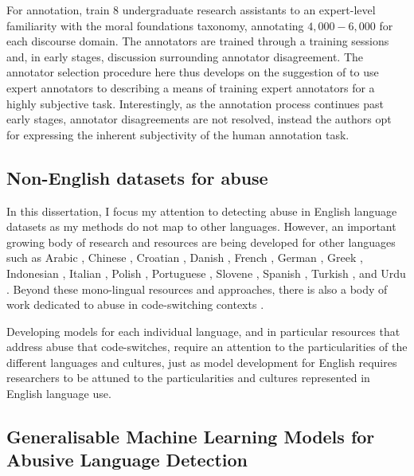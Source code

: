 For annotation, \citet{Hoover:2019} train $8$ undergraduate research assistants to an expert-level familiarity with the moral foundations taxonomy, annotating $4,000 - 6,000$ for each discourse domain. The annotators are trained through a training sessions and, in early stages, discussion surrounding annotator disagreement.  
The annotator selection procedure here thus develops on the suggestion of \citet{Waseem:2016} to use expert annotators to describing a means of training expert annotators for a highly subjective task. Interestingly, as the annotation process continues past early stages, annotator disagreements are not resolved, instead the authors opt for expressing the inherent subjectivity of the human annotation task.

\subsection{Non-English datasets for abuse}

In this dissertation, I focus my attention to detecting abuse in English language datasets as my methods do not map to other languages. However, an important growing body of research and resources are being developed for other languages such as Arabic \citep{Arabic abuse papers}, Chinese \citep{Chinese abuse papers}, Croatian \citep{Croatian papers}, Danish \citep{Danish abuse data}, French \citep{French papers}, German \citep{German papers}, Greek \citep{Greek papers}, Indonesian \citep{Indonesian papers}, Italian \citep{Italian papers}, Polish \citep{Polish papers}, Portuguese \citep{Portuguese papers}, Slovene \citep{Slovenian papers}, Spanish \citep{Spanish papers}, Turkish \citep{Turkish papers}, and Urdu \citep{Urdu papers}. Beyond these mono-lingual resources and approaches, there is also a body of work dedicated to abuse in code-switching contexts \citep{Code switching papers}.

Developing models for each individual language, and in particular resources that address abuse that code-switches, require an attention to the particularities of the different languages and cultures, just as model development for English requires researchers to be attuned to the particularities and cultures represented in English language use.


\subsection{Generalisable Machine Learning Models for Abusive Language Detection}


